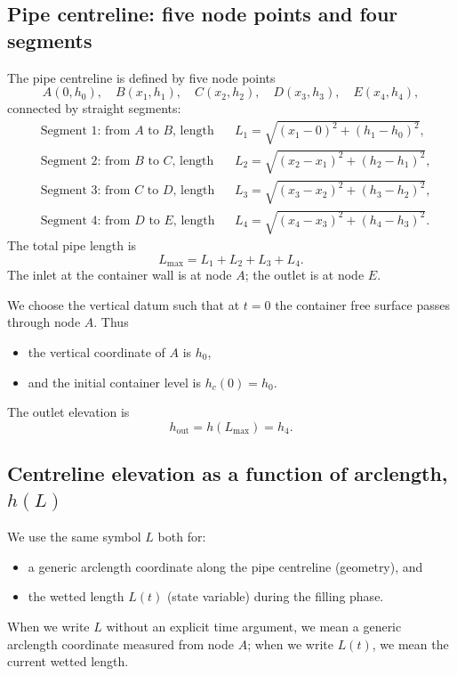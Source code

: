 \documentclass[11pt]{article}
\begin{document}
\subsection{Pipe centreline: five node points and four segments}

The pipe centreline is defined by five node points
\[
A(0,h_0),\quad B(x_1,h_1),\quad C(x_2,h_2),\quad D(x_3,h_3),\quad E(x_4,h_4),
\]
connected by straight segments:
\begin{align*}
  &\text{Segment 1: from $A$ to $B$, length} &&
    L_1 = \sqrt{(x_1 - 0)^2 + (h_1 - h_0)^2},\\
  &\text{Segment 2: from $B$ to $C$, length} &&
    L_2 = \sqrt{(x_2 - x_1)^2 + (h_2 - h_1)^2},\\
  &\text{Segment 3: from $C$ to $D$, length} &&
    L_3 = \sqrt{(x_3 - x_2)^2 + (h_3 - h_2)^2},\\
  &\text{Segment 4: from $D$ to $E$, length} &&
    L_4 = \sqrt{(x_4 - x_3)^2 + (h_4 - h_3)^2}.
\end{align*}
The total pipe length is
\[
  L_{\max} = L_1 + L_2 + L_3 + L_4.
\]
The inlet at the container wall is at node $A$; the outlet is at node $E$.

We choose the vertical datum such that at $t=0$ the container free surface passes through
node $A$. Thus
\begin{itemize}
  \item the vertical coordinate of $A$ is $h_0$,
  \item and the initial container level is $h_c(0) = h_0$.
\end{itemize}
The outlet elevation is
\[
  h_{\text{out}} = h(L_{\max}) = h_4.
\]

\subsection{Centreline elevation as a function of arclength, $h(L)$}

We use the same symbol $L$ both for:
\begin{itemize}
  \item a generic arclength coordinate along the pipe centreline (geometry), and
  \item the wetted length $L(t)$ (state variable) during the filling phase.
\end{itemize}
When we write $L$ without an explicit time argument, we mean a generic arclength coordinate
measured from node $A$; when we write $L(t)$, we mean the current wetted length.
\end{document}
